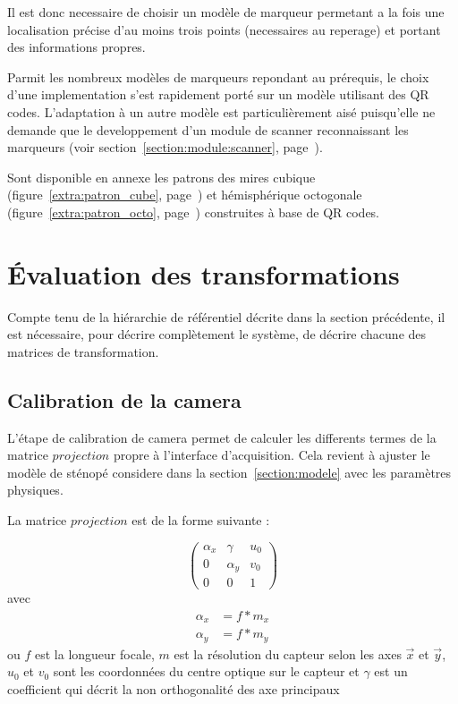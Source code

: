 \documentclass[10pt,a4paper,twoside, twocolumn]{report}
\begin{document}
Il est donc necessaire de choisir un modèle de marqueur permetant a la fois une localisation précise d'au moins trois points (necessaires au reperage) et portant des informations propres.

Parmit les nombreux modèles de marqueurs repondant au prérequis, le choix d'une implementation s'est rapidement porté sur un modèle utilisant des QR codes. L'adaptation à un autre modèle est particulièrement aisé puisqu'elle ne demande que le developpement d'un module de scanner reconnaissant les marqueurs (voir section~\ref{section:module:scanner}, page~\pageref{section:module:scanner}).

Sont disponible en annexe les patrons des mires cubique (figure~\ref{extra:patron_cube}, page~\pageref{extra:patron_cube}) et hémisphérique octogonale (figure~\ref{extra:patron_octo}, page~\pageref{extra:patron_octo}) construites à base de QR codes.



\section{Évaluation des transformations}

Compte tenu de la hiérarchie de référentiel décrite dans la section précédente, il est nécessaire, pour décrire complètement le système, de décrire chacune des matrices de transformation. 


\subsection{Calibration de la camera}

L'étape de calibration de camera permet de calculer les differents termes de la matrice $projection$ propre à l'interface d'acquisition. Cela revient à ajuster le modèle de sténopé considere dans la section~\ref{section:modele} avec les paramètres physiques.

La matrice $projection$ est de la forme suivante :

\begin{equation}
	\begin{pmatrix}
		\alpha_x	&	\gamma		& u_0	\\
		0					&	\alpha_y	&	v_0	\\
		0					&	0					&	1
	\end{pmatrix}
\end{equation}
avec 
\begin{align*}
	\alpha_x	&= f * m_x	\\
	\alpha_y	&= f * m_y
\end{align*}
ou $f$ est la longueur focale, $m$ est la résolution du capteur selon les axes $\vec x$ et $\vec y$, $u_0$ et $v_0$ sont les coordonnées du centre optique sur le capteur et $\gamma$ est un coefficient qui décrit la non orthogonalité des axe principaux
\end{document}
